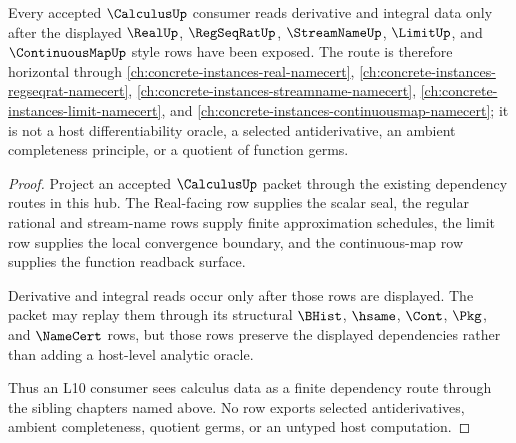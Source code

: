 \begin{theorem}
\label{thm:calculus-l10-dependency-route}
Every accepted $\CalculusUp$ consumer reads derivative and integral data only after the displayed $\RealUp$, $\RegSeqRatUp$, $\StreamNameUp$, $\LimitUp$, and $\ContinuousMapUp$ style rows have been exposed. The route is therefore horizontal through \autoref{ch:concrete-instances-real-namecert}, \autoref{ch:concrete-instances-regseqrat-namecert}, \autoref{ch:concrete-instances-streamname-namecert}, \autoref{ch:concrete-instances-limit-namecert}, and \autoref{ch:concrete-instances-continuousmap-namecert}; it is not a host differentiability oracle, a selected antiderivative, an ambient completeness principle, or a quotient of function germs.
\end{theorem}
\begin{proof}
Project an accepted $\CalculusUp$ packet through the existing dependency routes in this hub. The Real-facing row supplies the scalar seal, the regular rational and stream-name rows supply finite approximation schedules, the limit row supplies the local convergence boundary, and the continuous-map row supplies the function readback surface.

Derivative and integral reads occur only after those rows are displayed. The packet may replay them through its structural $\BHist$, $\hsame$, $\Cont$, $\Pkg$, and $\NameCert$ rows, but those rows preserve the displayed dependencies rather than adding a host-level analytic oracle.

Thus an L10 consumer sees calculus data as a finite dependency route through the sibling chapters named above. No row exports selected antiderivatives, ambient completeness, quotient germs, or an untyped host computation.
\end{proof}
